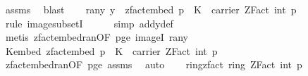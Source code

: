 \begin{isabellebody}
\ assms{\isacharparenleft}{\kern0pt}{}{\isacharparenright}{\kern0pt}\ \isamarkupfalse%
\ blast\isanewline
\isanewline
\ \ \isamarkupfalse%
\ ran{\isacharunderscore}{\kern0pt}y{\isacharprime}{\kern0pt}{\isacharcolon}{\kern0pt}\ {\isachardoublequoteopen}y{\isacharprime}{\kern0pt}\ {\isacharbackquote}{\kern0pt}\ {\isacharparenleft}{\kern0pt}zfact{\isacharunderscore}{\kern0pt}embed\ p\ {\isacharbackquote}{\kern0pt}\ K{\isacharparenright}{\kern0pt}\ {\isasymsubseteq}\ carrier\ {\isacharparenleft}{\kern0pt}ZFact\ {\isacharparenleft}{\kern0pt}int\ p{\isacharparenright}{\kern0pt}{\isacharparenright}{\kern0pt}{\isachardoublequoteclose}\isanewline
\ \ \ \ \isamarkupfalse%
\ {\isacharparenleft}{\kern0pt}rule\ image{\isacharunderscore}{\kern0pt}subsetI{\isacharparenright}{\kern0pt}\isanewline
\ \ \ \ \isamarkupfalse%
\ {\isacharparenleft}{\kern0pt}simp\ add{\isacharcolon}{\kern0pt}y{\isacharprime}{\kern0pt}{\isacharunderscore}{\kern0pt}def{\isacharparenright}{\kern0pt}\isanewline
\ \ \ \ \isamarkupfalse%
\ {\isacharparenleft}{\kern0pt}metis\ zfact{\isacharunderscore}{\kern0pt}embed{\isacharunderscore}{\kern0pt}ran{\isacharbrackleft}{\kern0pt}OF\ p{\isacharunderscore}{\kern0pt}ge{\isacharunderscore}{\kern0pt}{}{\isacharbrackright}{\kern0pt}\ imageI\ ran{\isacharunderscore}{\kern0pt}y{\isacharparenright}{\kern0pt}\isanewline
\isanewline
\ \ \isamarkupfalse%
\ K{\isacharunderscore}{\kern0pt}embed{\isacharcolon}{\kern0pt}\ {\isachardoublequoteopen}zfact{\isacharunderscore}{\kern0pt}embed\ p\ {\isacharbackquote}{\kern0pt}\ K\ {\isasymsubseteq}\ carrier\ {\isacharparenleft}{\kern0pt}ZFact\ {\isacharparenleft}{\kern0pt}int\ p{\isacharparenright}{\kern0pt}{\isacharparenright}{\kern0pt}{\isachardoublequoteclose}\isanewline
\ \ \ \ \isamarkupfalse%
\ zfact{\isacharunderscore}{\kern0pt}embed{\isacharunderscore}{\kern0pt}ran{\isacharbrackleft}{\kern0pt}OF\ p{\isacharunderscore}{\kern0pt}ge{\isacharunderscore}{\kern0pt}{}{\isacharbrackright}{\kern0pt}\ assms{\isacharparenleft}{\kern0pt}{}{\isacharparenright}{\kern0pt}\ \isamarkupfalse%
\ auto\isanewline
\isanewline
\ \ \isamarkupfalse%
\ ring{\isacharunderscore}{\kern0pt}zfact{\isacharcolon}{\kern0pt}\ {\isachardoublequoteopen}ring\ {\isacharparenleft}{\kern0pt}ZFact\ {\isacharparenleft}{\kern0pt}int\ p{\isacharparenright}{\kern0pt}{\isacharparenright}{\kern0pt}{\isachardoublequoteclose}\ \isanewline
\ \ \ \ \isamarkupfalse%

\end{isabellebody}
